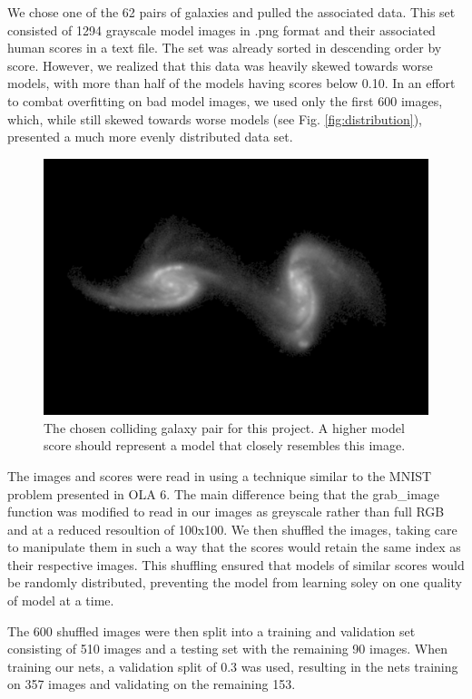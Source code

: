 \documentclass[conference]{IEEEtran}
\begin{document}
We chose one of the 62 pairs of galaxies and pulled the associated data. This set consisted of 1294 grayscale model images in .png format and their associated human scores in a text file. The set was already sorted in descending order by score. However, we realized that this data was heavily skewed towards worse models, with more than half of the models having scores below 0.10. In an effort to combat overfitting on bad model images, we used only the first 600 images, which, while still skewed towards worse models (see Fig. \ref{fig:distribution}), presented a much more evenly distributed data set.

\begin{figure}[htbp]
\centerline{\includegraphics[width=0.75\linewidth]{./Images/target.png}}
\caption{The chosen colliding galaxy pair for this project. A higher model score should represent a model that closely resembles this image.}
\label{fig:TargetGalaxy}
\end{figure}

The images and scores were read in using a technique similar to the MNIST problem presented in OLA 6. The main difference being that the grab\_image function was modified to read in our images as greyscale rather than full RGB and at a reduced resoultion of 100x100. We then shuffled the images, taking care to manipulate them in such a way that the scores would retain the same index as their respective images. This shuffling ensured that models of similar scores would be randomly distributed, preventing the model from learning soley on one quality of model at a time. 

The 600 shuffled images were then split into a training and validation set consisting of 510 images and a testing set with the remaining 90 images. When training our nets, a validation split of 0.3 was used, resulting in the nets training on 357 images and validating on the remaining 153.
\end{document}
